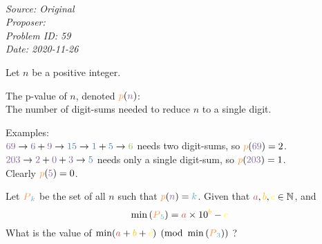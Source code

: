 \SSbreak\\
\emph{Source: Original}\\
\emph{Proposer: \Pkee}\\
\emph{Problem ID: 59}\\
\emph{Date: 2020-11-26}\\
\SSbreak

\begin{mdframed}[backgroundcolor=pagegray,rightline=false,leftline=false, topline=false, bottomline=false]
    \color{white}
    Let \textcolor{qpurple}{$n$} be a positive integer.
    \par
    The \textcolor{qlorange}{p-value} of \textcolor{qpurple}{$n$}, denoted $\persistk{n}$: \\

    The number of digit-sums needed to reduce \textcolor{qpurple}{$n$} to a single digit.
    \par
    Examples: \\

    $\textcolor{qpurple}{69} \rightarrow \textcolor{qpurple}{6} + \textcolor{qpurple}{9} \rightarrow \textcolor{qblue}{15} \rightarrow \textcolor{qblue}{1} + \textcolor{qblue}{5} \rightarrow \textcolor{qgreen}{6}$ needs two digit-sums, so $\persistk{69} = 2$. \\
    $\textcolor{qpurple}{203} \rightarrow \textcolor{qpurple}{2} + \textcolor{qpurple}{0} +  \textcolor{qpurple}{3} \rightarrow \textcolor{qblue}{5}$ needs only a single digit-sum, so $\persistk{203} = 1$. \\
    Clearly $\persistk{5} = 0$.\\

    \par
    Let $\persistsetk{k}$ be the set of all \textcolor{qpurple}{$n$} such that $\persistk{n} = \textcolor{qlblue}{k}$. Given that $\textcolor{qred}{a}, \textcolor{qorange}{b}, \textcolor{qyellow}{c} \in \mathbb{N}$, and
    \begin{equation*}
        \min{(\persistsetk{5})} = \textcolor{qred}{a}\times 10^{\textcolor{qorange}{b}} - \textcolor{qyellow}{c}
    \end{equation*}
    What is the value of $\min(\textcolor{qred}{a} + \textcolor{qorange}{b} + \textcolor{qyellow}{c}) \pmod{\min{(\persistsetk{3})}}$ ?
\end{mdframed}
\color{black}
\bigskip

\begin{solution}
    
\end{solution}
